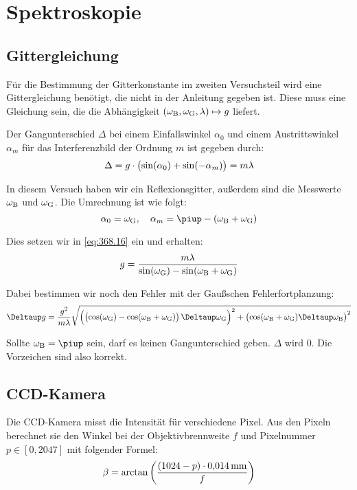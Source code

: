 \section{Spektroskopie}

\subsection{Gittergleichung}

Für die Bestimmung der Gitterkonstante im zweiten Versuchsteil wird eine
Gittergleichung benötigt, die nicht in der Anleitung gegeben ist. Diese muss
eine Gleichung sein, die die Abhängigkeit $(\omega_\text B, \omega_\text G,
\lambda) \mapsto g$ liefert.

Der Gangunterschied $\Delta$ bei einem Einfallswinkel $\alpha_0$ und einem
Austrittswinkel $\alpha_m$ für das Interferenzbild der Ordnung $m$ ist gegeben
durch: \parencite[Formel~368.16]{physik312-Anleitung}
\begin{equation}
    \label{eq:368.16}
    \Delta = g \cdot \del{\sin(\alpha_0) + \sin(-\alpha_m)} = m \lambda
\end{equation}

In diesem Versuch haben wir ein Reflexionsgitter, außerdem sind die Messwerte
$\omega_\text B$ und $\omega_\text G$. Die Umrechnung ist wie folgt:
\[
    \alpha_0 = \omega_\text G
    \eqnsep
    \alpha_m = \piup - \del{ \omega_\text B + \omega_\text G }
\]

Dies setzen wir in \eqref{eq:368.16} ein und erhalten:
\begin{equation}
    \label{eq:gittergleichung}
    g = \frac{m \lambda}{\sin(\omega_\text G) - \sin(\omega_\text B + \omega_\text G)}
\end{equation}

Dabei bestimmen wir noch den Fehler mit der Gaußschen Fehlerfortplanzung:
\[
    \Deltaup g
    = \frac{g^2}{m\lambda} \sqrt{
        \del{\del{\cos(\omegaG) - \cos(\omegaB +
        \omegaG)} \Deltaup \omegaG}^2
        +
        \del{\cos(\omegaB + \omegaG) \Deltaup \omegaB}^2
    }
\]

Sollte $\omega_\text B = \piup$ sein, darf es keinen Gangunterschied geben.
$\Delta$ wird 0. Die Vorzeichen sind also korrekt.

\subsection{CCD-Kamera}

Die CCD-Kamera misst die Intensität für verschiedene Pixel. Aus den Pixeln
berechnet sie den Winkel bei der Objektivbrennweite $f$ und Pixelnummer $p \in
[0, 2047]$ mit folgender Formel:
\[
    \beta = \arctan\del{\frac{(1024 - p) \cdot \SI{0.014}{\milli\meter}}f}
\]

